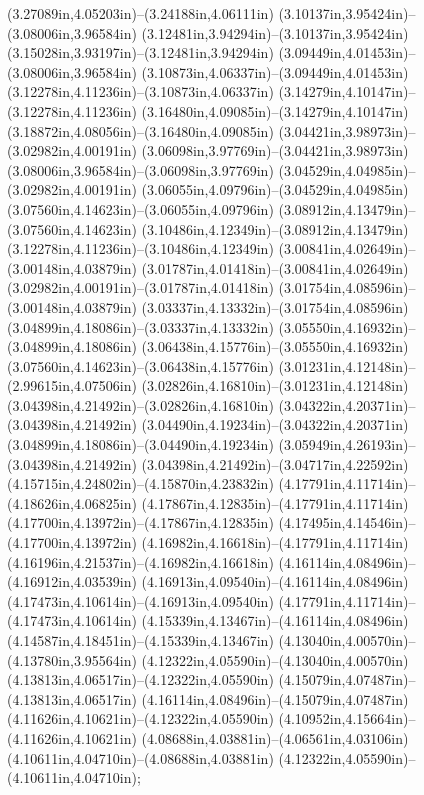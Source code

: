 (3.27089in,4.05203in)--(3.24188in,4.06111in) (3.10137in,3.95424in)--(3.08006in,3.96584in) (3.12481in,3.94294in)--(3.10137in,3.95424in) (3.15028in,3.93197in)--(3.12481in,3.94294in) (3.09449in,4.01453in)--(3.08006in,3.96584in) (3.10873in,4.06337in)--(3.09449in,4.01453in) (3.12278in,4.11236in)--(3.10873in,4.06337in) (3.14279in,4.10147in)--(3.12278in,4.11236in) (3.16480in,4.09085in)--(3.14279in,4.10147in) (3.18872in,4.08056in)--(3.16480in,4.09085in) (3.04421in,3.98973in)--(3.02982in,4.00191in) (3.06098in,3.97769in)--(3.04421in,3.98973in) (3.08006in,3.96584in)--(3.06098in,3.97769in) (3.04529in,4.04985in)--(3.02982in,4.00191in) (3.06055in,4.09796in)--(3.04529in,4.04985in) (3.07560in,4.14623in)--(3.06055in,4.09796in) (3.08912in,4.13479in)--(3.07560in,4.14623in) (3.10486in,4.12349in)--(3.08912in,4.13479in) (3.12278in,4.11236in)--(3.10486in,4.12349in) (3.00841in,4.02649in)--(3.00148in,4.03879in) (3.01787in,4.01418in)--(3.00841in,4.02649in) (3.02982in,4.00191in)--(3.01787in,4.01418in) (3.01754in,4.08596in)--(3.00148in,4.03879in) (3.03337in,4.13332in)--(3.01754in,4.08596in) (3.04899in,4.18086in)--(3.03337in,4.13332in) (3.05550in,4.16932in)--(3.04899in,4.18086in) (3.06438in,4.15776in)--(3.05550in,4.16932in) (3.07560in,4.14623in)--(3.06438in,4.15776in) (3.01231in,4.12148in)--(2.99615in,4.07506in) (3.02826in,4.16810in)--(3.01231in,4.12148in) (3.04398in,4.21492in)--(3.02826in,4.16810in) (3.04322in,4.20371in)--(3.04398in,4.21492in) (3.04490in,4.19234in)--(3.04322in,4.20371in) (3.04899in,4.18086in)--(3.04490in,4.19234in) (3.05949in,4.26193in)--(3.04398in,4.21492in) (3.04398in,4.21492in)--(3.04717in,4.22592in) (4.15715in,4.24802in)--(4.15870in,4.23832in) (4.17791in,4.11714in)--(4.18626in,4.06825in) (4.17867in,4.12835in)--(4.17791in,4.11714in) (4.17700in,4.13972in)--(4.17867in,4.12835in) (4.17495in,4.14546in)--(4.17700in,4.13972in) (4.16982in,4.16618in)--(4.17791in,4.11714in) (4.16196in,4.21537in)--(4.16982in,4.16618in) (4.16114in,4.08496in)--(4.16912in,4.03539in) (4.16913in,4.09540in)--(4.16114in,4.08496in) (4.17473in,4.10614in)--(4.16913in,4.09540in) (4.17791in,4.11714in)--(4.17473in,4.10614in) (4.15339in,4.13467in)--(4.16114in,4.08496in) (4.14587in,4.18451in)--(4.15339in,4.13467in) (4.13040in,4.00570in)--(4.13780in,3.95564in) (4.12322in,4.05590in)--(4.13040in,4.00570in) (4.13813in,4.06517in)--(4.12322in,4.05590in) (4.15079in,4.07487in)--(4.13813in,4.06517in) (4.16114in,4.08496in)--(4.15079in,4.07487in) (4.11626in,4.10621in)--(4.12322in,4.05590in) (4.10952in,4.15664in)--(4.11626in,4.10621in) (4.08688in,4.03881in)--(4.06561in,4.03106in) (4.10611in,4.04710in)--(4.08688in,4.03881in) (4.12322in,4.05590in)--(4.10611in,4.04710in);
